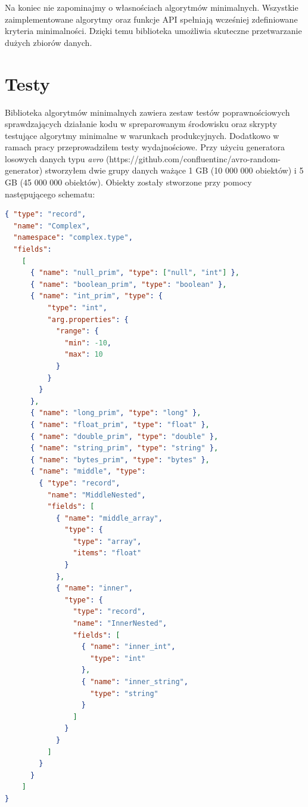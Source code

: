 \documentclass[licencjacka]{pracamgr}
\begin{document}
Na koniec nie zapominajmy o własnościach algorytmów minimalnych. Wszystkie zaimplementowane algorytmy oraz funkcje API spełniają wcześniej zdefiniowane kryteria minimalności. Dzięki temu biblioteka umożliwia skuteczne przetwarzanie dużych zbiorów danych.

\chapter{Testy}

Biblioteka algorytmów minimalnych zawiera zestaw testów poprawnościowych sprawdzających działanie kodu w spreparowanym środowisku oraz skrypty testujące algorytmy minimalne w warunkach produkcyjnych. Dodatkowo w ramach pracy przeprowadziłem testy wydajnościowe. Przy użyciu generatora losowych danych typu \textit{avro} (https://github.com/confluentinc/avro-random-generator) stworzyłem dwie grupy danych ważące 1 GB (10 000 000 obiektów) i 5 GB (45 000 000 obiektów). Obiekty zostały stworzone przy pomocy następującego schematu:

\begin{lstlisting}[language=json,firstnumber=1]
{ "type": "record",
  "name": "Complex",
  "namespace": "complex.type",
  "fields":
    [
      { "name": "null_prim", "type": ["null", "int"] },
      { "name": "boolean_prim", "type": "boolean" },
      { "name": "int_prim", "type": {
          "type": "int",
          "arg.properties": {
            "range": {
              "min": -10,
              "max": 10
            }
          }
        }
      },
      { "name": "long_prim", "type": "long" },
      { "name": "float_prim", "type": "float" },
      { "name": "double_prim", "type": "double" },
      { "name": "string_prim", "type": "string" },
      { "name": "bytes_prim", "type": "bytes" },
      { "name": "middle", "type":
        { "type": "record",
          "name": "MiddleNested",
          "fields": [
            { "name": "middle_array",
              "type": {
                "type": "array",
                "items": "float"
              }
            },
            { "name": "inner",
              "type": {
                "type": "record",
                "name": "InnerNested",
                "fields": [
                  { "name": "inner_int",
                    "type": "int"
                  },
                  { "name": "inner_string",
                    "type": "string"
                  }
                ]
              }
            }
          ]
        }
      }
    ]
}
\end{lstlisting}
\end{document}
